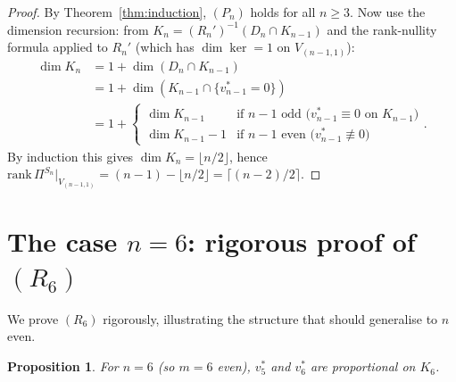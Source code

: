 \documentclass[11pt]{article}
\newtheorem{proposition}[theorem]{Proposition}
\theoremstyle{definition}
\begin{document}
\begin{proof}
By Theorem~\ref{thm:induction}, $(P_n)$ holds for all $n \ge 3$.
Now use the dimension recursion: from
$K_n = (R_n')^{-1}(D_n \cap K_{n-1})$ and the rank-nullity formula
applied to $R_n'$ (which has $\dim\ker = 1$ on $V_{(n-1,1)}$):
\[
\begin{aligned}
\dim K_n &= 1 + \dim(D_n \cap K_{n-1}) \\
         &= 1 + \dim(K_{n-1} \cap \{v_{n-1}^*=0\}) \\
         &= 1 + \begin{cases}\dim K_{n-1} & \text{if } n-1 \text{ odd (}v_{n-1}^*\equiv 0\text{ on }K_{n-1}) \\ \dim K_{n-1} - 1 & \text{if } n-1 \text{ even (}v_{n-1}^*\not\equiv 0\text{)}\end{cases}.
\end{aligned}
\]
By induction this gives $\dim K_n = \lfloor n/2 \rfloor$, hence
$\mathrm{rank}\,\Pi^{S_n}|_{V_{(n-1,1)}} = (n-1) - \lfloor n/2 \rfloor = \lceil(n-2)/2\rceil$.
\end{proof}

\section{The case $n=6$: rigorous proof of $(R_6)$}
\label{sec:n6}

We prove $(R_6)$ rigorously, illustrating the structure that should
generalise to $n$ even.

\begin{proposition}\label{prop:R6}
For $n=6$ (so $m=6$ even), $v_5^*$ and $v_6^*$ are proportional on
$K_6$.
\end{proposition}
\end{document}
